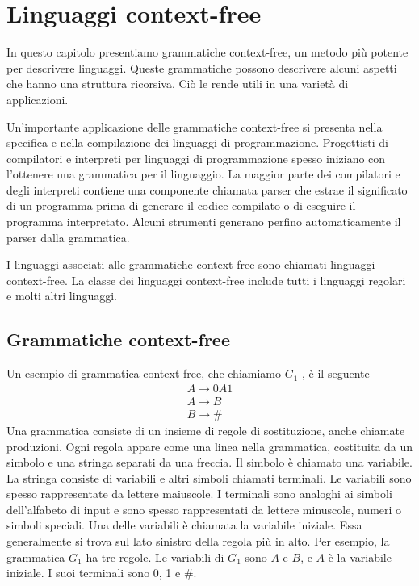 \chapter{Linguaggi context-free}
In questo capitolo presentiamo grammatiche context-free, un metodo più potente per descrivere linguaggi. Queste grammatiche possono descrivere alcuni aspetti che hanno una struttura ricorsiva. Ciò le rende utili in una varietà di applicazioni.

Un'importante applicazione delle grammatiche context-free si presenta nella specifica e nella compilazione dei linguaggi di programmazione. Progettisti di compilatori e interpreti per linguaggi di programmazione spesso iniziano con l'ottenere una grammatica per il linguaggio. La maggior parte dei compilatori e degli interpreti contiene una componente chiamata parser che estrae il significato di un programma prima di generare il codice compilato o di eseguire il programma interpretato. Alcuni strumenti generano perfino automaticamente il parser dalla grammatica.

I linguaggi associati alle grammatiche context-free sono chiamati linguaggi context-free. La classe dei linguaggi context-free include tutti i linguaggi regolari e molti altri linguaggi.

\section{Grammatiche context-free}
Un esempio di grammatica context-free, che chiamiamo $G_{1}$ , è il seguente
\begin{gather*}
A\to 0A1\\
A\to B\\
B\to \#
\end{gather*}
Una grammatica consiste di un insieme di regole di sostituzione, anche chiamate produzioni. Ogni regola appare come una linea nella grammatica, costituita da un simbolo e una stringa separati da una freccia. Il simbolo è chiamato una variabile. La stringa consiste di variabili e altri simboli chiamati terminali. Le variabili sono spesso rappresentate da lettere maiuscole. I terminali sono analoghi ai simboli dell'alfabeto di input e sono spesso rappresentati da lettere minuscole, numeri o simboli speciali. Una delle variabili è chiamata la variabile iniziale. Essa generalmente si trova sul lato sinistro della regola più in alto. Per esempio, la grammatica $G_{1}$ ha tre regole. Le variabili di $G_{1}$ sono $A$ e $B$, e $A$ è la variabile iniziale. I suoi terminali sono 0, 1 e $\#$.


